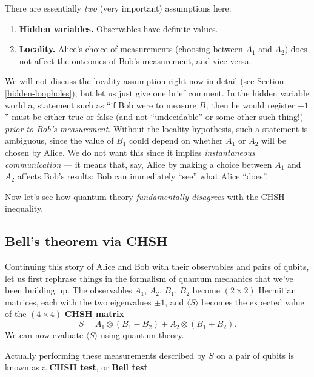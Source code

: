 \documentclass[fleqn,a4paper]{article}
\providecommand{\tightlist}{\setlength{\itemsep}{0pt}\setlength{\parskip}{0pt}}
\newenvironment{idea}{\everypar{\setlength{\parindent}{1.5em}}}{}
\theoremstyle{definition}
\theoremstyle{definition}
\theoremstyle{definition}
\theoremstyle{definition}
\theoremstyle{remark}
\begin{document}
There are essentially \emph{two} (very important) assumptions here:

\begin{enumerate}
\def\labelenumi{\arabic{enumi}.}
\tightlist
\item
  \textbf{Hidden variables.} Observables have definite values.
\item
  \textbf{Locality.} Alice's choice of measurements (choosing between \(A_1\) and \(A_2\)) does not affect the outcomes of Bob's measurement, and vice versa.
\end{enumerate}

We will not discuss the locality assumption right now in detail (see Section \ref{hidden-loopholes}), but let us just give one brief comment.
In the hidden variable world a, statement such as ``if Bob were to measure \(B_1\) then he would register \(+1\)'' must be either true or false (and not ``undecidable'' or some other such thing!) \emph{prior to Bob's measurement}.
Without the locality hypothesis, such a statement is ambiguous, since the value of \(B_1\) could depend on whether \(A_1\) or \(A_2\) will be chosen by Alice.
We do not want this since it implies \emph{instantaneous communication} --- it means that, say, Alice by making a choice between \(A_1\) and \(A_2\) affects Bob's results: Bob can immediately ``see'' what Alice ``does''.

Now let's see how quantum theory \emph{fundamentally disagrees} with the CHSH inequality.

\hypertarget{bells-theorem-via-chsh}{%
\subsection{Bell's theorem via CHSH}\label{bells-theorem-via-chsh}}

Continuing this story of Alice and Bob with their observables and pairs of qubits, let us first rephrase things in the formalism of quantum mechanics that we've been building up.
The observables \(A_1\), \(A_2\), \(B_1\), \(B_2\) become \((2\times 2)\) Hermitian matrices, each with the two eigenvalues \(\pm 1\), and \(\langle S\rangle\) becomes the expected value of the \((4\times 4)\) \textbf{CHSH matrix}
\[
  S = A_1\otimes(B_1-B_2) + A_2\otimes(B_1+B_2).
\]
We can now evaluate \(\langle S\rangle\) using quantum theory.

\begin{idea}
Actually performing these measurements described by \(S\) on a pair of qubits is known as a \textbf{CHSH test}, or \textbf{Bell test}.

\end{idea}
\end{document}
